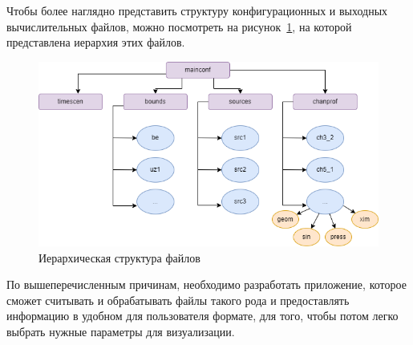 Чтобы более наглядно представить структуру конфигурационных и выходных вычислительных файлов, можно посмотреть на рисунок~\ref{fig:scheme}, на которой представлена иерархия этих файлов. 

\begin{figure}[H]
	\centering
	\includegraphics[width=1\linewidth]{pics/scheme}
	\caption{Иерархическая структура файлов}
	\label{fig:scheme}
\end{figure}

По вышеперечисленным причинам, необходимо разработать приложение, которое сможет считывать и обрабатывать файлы такого рода и предоставлять информацию в удобном для пользователя формате, для того, чтобы потом легко выбрать нужные параметры для визуализации. 


